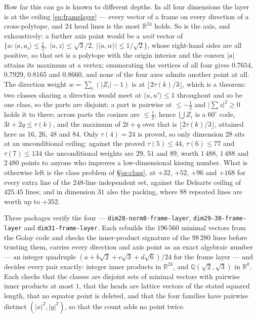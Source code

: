 \documentclass[11pt]{amsart}
\theoremstyle{remark}
\newcommand{\ip}[2]{\langle #1,#2\rangle}
\newcommand{\R}{\mathbb{R}}
\newcommand{\Q}{\mathbb{Q}}
\begin{document}
How far this can go is known to different depths. In all four dimensions the
layer is at the ceiling \eqref{eq:framelayer} --- every vector of a frame on
every direction of a cross-polytope, and $24$ head lines is the most $\R^{24}$
holds. So is the axis, and exhaustively: a further axis point would be a
\emph{unit} vector of $\{a:\ip{a}{a_{i}}\le\tfrac12,\ \ip{a}{z}\le\sqrt3/2,\
|\ip{a}{w}|\le1/\sqrt2\}$, whose right-hand sides are all positive, so that set
is a polytope with the origin interior and the convex $|a|$ attains its maximum
at a vertex; enumerating the vertices of all four gives $0.7654$, $0.7929$,
$0.8165$ and $0.8660$, and none of the four axes admits another point at all.
The direction weight $w=\sum_{i}(|Z_{i}|-1)$ is at $\lfloor2\tau(k)/3\rfloor$,
which is a theorem: two classes sharing a direction would meet at
$\ip{u}{u'}\le1$ throughout and so be one class, so the parts are disjoint; a
part is pairwise at $\le-\tfrac12$ and $|\sum z|^{2}\ge0$ holds it to three;
across parts the cosines are $\le\tfrac12$; hence $\bigcup Z_{i}$ is a
$60^{\circ}$ code, $3t+2q\le\tau(k)$, and the maximum of $2t+q$ over that is
$\lfloor2\tau(k)/3\rfloor$, attained here as $16$, $26$, $48$ and $84$. Only
$\tau(4)=24$ is proved, so only dimension $28$ sits at an unconditional ceiling:
against the proved $\tau(5)\le44$, $\tau(6)\le77$ and $\tau(7)\le134$ the
unconditional weights are $29$, $51$ and $89$, worth $1\,488$, $1\,488$ and
$2\,480$ points to anyone who improves a low-dimensional kissing number. What is
otherwise left is the class problem of \S\ref{ss:class}, at $+32$, $+52$, $+96$
and $+168$ for every extra line of the $248$-line independent set, against the
Delsarte ceiling of $425.45$ lines; and in dimension $31$ also the packing,
where $88$ repeated lines are worth up to $+352$.

\begin{sloppypar}
Three packages verify the four --- \texttt{dim28-norm8-frame-layer},
\texttt{dim29-30-frame-layer} and \texttt{dim31-frame-layer}. Each rebuilds the
$196\,560$ minimal vectors from the Golay code and checks the inner-product
signature of the $98\,280$ lines before trusting them, carries every direction
and axis point as an exact algebraic number --- an integer quadruple
$(a+b\sqrt2+c\sqrt3+d\sqrt6)/24$ for the frame layer --- and decides every pair
exactly: integer inner products in $\R^{24}$, and $\Q(\sqrt2,\sqrt3)$ in
$\R^{k}$. Each
checks that the classes are disjoint sets of minimal vectors with pairwise inner
products at most $1$, that the heads are lattice vectors of the stated squared
length, that no equator point is deleted, and that the four families have
pairwise distinct $(|x|^{2},|y|^{2})$, so that the count adds no point twice.
\end{sloppypar}
\end{document}
